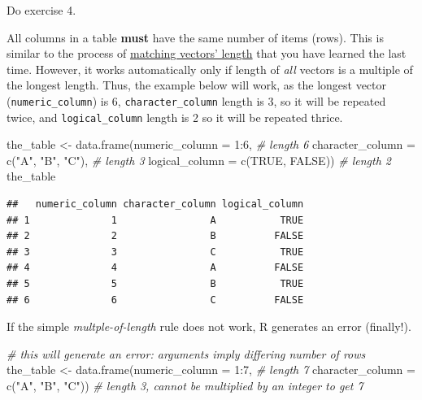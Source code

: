 \documentclass[
]{book}
\newenvironment{Shaded}{\begin{snugshade}}{\end{snugshade}}
\newcommand{\AttributeTok}[1]{\textcolor[rgb]{0.77,0.63,0.00}{#1}}
\newcommand{\CommentTok}[1]{\textcolor[rgb]{0.56,0.35,0.01}{\textit{#1}}}
\newcommand{\ConstantTok}[1]{\textcolor[rgb]{0.00,0.00,0.00}{#1}}
\newcommand{\DecValTok}[1]{\textcolor[rgb]{0.00,0.00,0.81}{#1}}
\newcommand{\FunctionTok}[1]{\textcolor[rgb]{0.00,0.00,0.00}{#1}}
\newcommand{\NormalTok}[1]{#1}
\newcommand{\OtherTok}[1]{\textcolor[rgb]{0.56,0.35,0.01}{#1}}
\newcommand{\SpecialCharTok}[1]{\textcolor[rgb]{0.00,0.00,0.00}{#1}}
\newcommand{\StringTok}[1]{\textcolor[rgb]{0.31,0.60,0.02}{#1}}
\begin{document}
Do exercise 4.

All columns in a table \textbf{must} have the same number of items (rows). This is similar to the process of \protect\hyperlink{different-length-vectors}{matching vectors' length} that you have learned the last time. However, it works automatically only if length of \emph{all} vectors is a multiple of the longest length. Thus, the example below will work, as the longest vector (\texttt{numeric\_column}) is 6, \texttt{character\_column} length is 3, so it will be repeated twice, and \texttt{logical\_column} length is 2 so it will be repeated thrice.

\begin{Shaded}
\begin{Highlighting}[]
\NormalTok{the\_table }\OtherTok{\textless{}{-}} \FunctionTok{data.frame}\NormalTok{(}\AttributeTok{numeric\_column =} \DecValTok{1}\SpecialCharTok{:}\DecValTok{6}\NormalTok{,                  }\CommentTok{\# length 6 }
                        \AttributeTok{character\_column =} \FunctionTok{c}\NormalTok{(}\StringTok{"A"}\NormalTok{, }\StringTok{"B"}\NormalTok{, }\StringTok{"C"}\NormalTok{),   }\CommentTok{\# length 3}
                        \AttributeTok{logical\_column =} \FunctionTok{c}\NormalTok{(}\ConstantTok{TRUE}\NormalTok{, }\ConstantTok{FALSE}\NormalTok{))       }\CommentTok{\# length 2}
\NormalTok{the\_table}
\end{Highlighting}
\end{Shaded}

\begin{verbatim}
##   numeric_column character_column logical_column
## 1              1                A           TRUE
## 2              2                B          FALSE
## 3              3                C           TRUE
## 4              4                A          FALSE
## 5              5                B           TRUE
## 6              6                C          FALSE
\end{verbatim}

If the simple \emph{multple-of-length} rule does not work, R generates an error (finally!).

\begin{Shaded}
\begin{Highlighting}[]
\CommentTok{\# this will generate an error: arguments imply differing number of rows}
\NormalTok{the\_table }\OtherTok{\textless{}{-}} \FunctionTok{data.frame}\NormalTok{(}\AttributeTok{numeric\_column =} \DecValTok{1}\SpecialCharTok{:}\DecValTok{7}\NormalTok{,                 }\CommentTok{\# length 7}
                        \AttributeTok{character\_column =} \FunctionTok{c}\NormalTok{(}\StringTok{"A"}\NormalTok{, }\StringTok{"B"}\NormalTok{, }\StringTok{"C"}\NormalTok{))  }\CommentTok{\# length 3, cannot be multiplied by an integer to get 7}
\end{Highlighting}
\end{Shaded}
\end{document}
